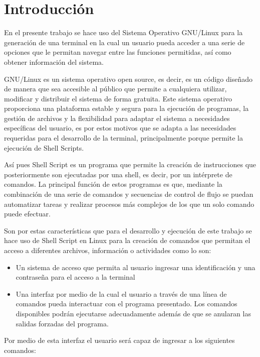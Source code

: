 \documentclass[12pt,a4paper]{article}
\begin{document}
\section{Introducción}
\noindent En el presente trabajo se hace uso del Sistema Operativo GNU/Linux para la generación de una terminal en la cual un usuario pueda acceder a una serie de opciones que le permitan navegar entre las funciones permitidas, así como obtener información del sistema.

GNU/Linux es un sistema operativo open source, es decir, es un código diseñado de manera que sea accesible al público que permite a cualquiera utilizar, modificar y distribuir el sistema de forma gratuita. Este sistema operativo proporciona una plataforma estable y segura para la ejecución de programas, la gestión de archivos y la flexibilidad para adaptar el sistema a necesidades específicas del usuario, es por estos motivos que se adapta a las necesidades requeridas para el desarrollo de la terminal, principalmente porque permite la ejecución de Shell Scripts.

Así pues Shell Script es un programa que permite la creación de instrucciones que posteriormente son ejecutadas por una shell, es decir, por un intérprete de comandos. La principal función de estos programas es que, mediante la combinación de una serie de comandos y secuencias de control de flujo se puedan automatizar tareas y realizar procesos más complejos de los que un solo comando puede efectuar.

Son por estas características que para el desarrollo y ejecución de este trabajo se hace uso de Shell Script en Linux para la creación de comandos que permitan el acceso a diferentes archivos, información o actividades como lo son:

\begin{itemize}
    \item Un sistema de acceso que permita al usuario ingresar una identificación y una contraseña para el acceso a la terminal
    \item Una interfaz por medio de la cual el usuario a través de una línea de comandos pueda interactuar con el programa presentado. Los comandos disponibles podrán ejecutarse adecuadamente además de que se anularan las salidas forzadas del programa.
\end{itemize}

\noindent Por medio de esta interfaz el usuario será capaz de ingresar a los siguientes comandos:
\end{document}
